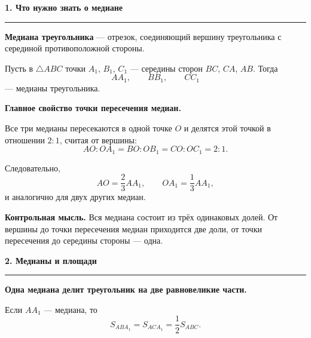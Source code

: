 \documentclass[a4paper,12pt]{article}
\newcommand{\checksection}[1]{%
  \vspace{0.7em}%
  {\Large\bfseries\color{darkaccent}#1}\par
  \vspace{0.25em}
  {\color{rulegray}\rule{\linewidth}{0.6pt}}\par
  \vspace{0.5em}
}
\newcommand{\key}[1]{\textbf{\color{darkaccent}#1}}
\newcommand{\SABC}{S_{ABC}}
\begin{document}
\checksection{1. Что нужно знать о медиане}

\key{Медиана треугольника} --- отрезок, соединяющий вершину
треугольника с серединой противоположной стороны.

Пусть в $\triangle ABC$ точки $A_1$, $B_1$, $C_1$ ---
середины сторон $BC$, $CA$, $AB$. Тогда
\[
AA_1,\qquad BB_1,\qquad CC_1
\]
--- медианы треугольника.

\begin{center}
\end{center}

\key{Главное свойство точки пересечения медиан.}

Все три медианы пересекаются в одной точке $O$ и делятся
этой точкой в отношении $2:1$, считая от вершины:
\[
AO:OA_1
=
BO:OB_1
=
CO:OC_1
=
2:1.
\]

Следовательно,
\[
AO=\frac23 AA_1,
\qquad
OA_1=\frac13 AA_1,
\]
и аналогично для двух других медиан.

\textbf{Контрольная мысль.}
Вся медиана состоит из трёх одинаковых долей.
От вершины до точки пересечения медиан приходится две доли,
от точки пересечения до середины стороны --- одна.


\checksection{2. Медианы и площади}

\key{Одна медиана делит треугольник на две равновеликие части.}

Если $AA_1$ --- медиана, то
\[
S_{ABA_1}=S_{ACA_1}=\frac12\SABC.
\]
\end{document}
